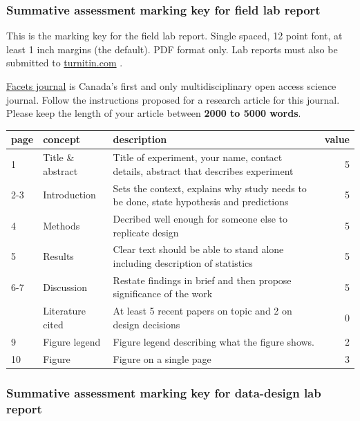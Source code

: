 \documentclass[
]{book}
\begin{document}
\hypertarget{summative-assessment-marking-key-for-field-lab-report}{%
\subsubsection*{Summative assessment marking key for field lab report}\label{summative-assessment-marking-key-for-field-lab-report}}

This is the marking key for the field lab report. Single spaced, 12 point font, at least 1 inch margins (the default). PDF format only. Lab reports must also be submitted to \href{https://www.turnitin.com}{turnitin.com} .

\href{https://www.facetsjournal.com/for-authors/instructions-to-authors}{Facets journal} is Canada's first and only multidisciplinary open access science journal. Follow the instructions proposed for a research article for this journal. Please keep the length of your article between \textbf{2000 to 5000 words}.

\begin{tabular}{lllr}
\toprule
page & concept & description & value\\
\midrule
1 & Title \& abstract & Title of experiment, your name, contact details, abstract that describes experiment & 5\\
2-3 & Introduction & Sets the context, explains why study needs to be done, state hypothesis and predictions & 5\\
4 & Methods & Decribed well enough for someone else to replicate design & 5\\
5 & Results & Clear text should be able to stand alone including description of statistics & 5\\
6-7 & Discussion & Restate findings in brief and then propose significance of the work & 5\\
\addlinespace
8 & Literature cited & At least 5 recent papers on topic and 2 on design decisions & 0\\
9 & Figure legend & Figure legend describing what the figure shows. & 2\\
10 & Figure & Figure on a single page & 3\\
\bottomrule
\end{tabular}

\hypertarget{summative-assessment-marking-key-for-data-design-lab-report}{%
\subsubsection*{Summative assessment marking key for data-design lab report}\label{summative-assessment-marking-key-for-data-design-lab-report}}
\end{document}
